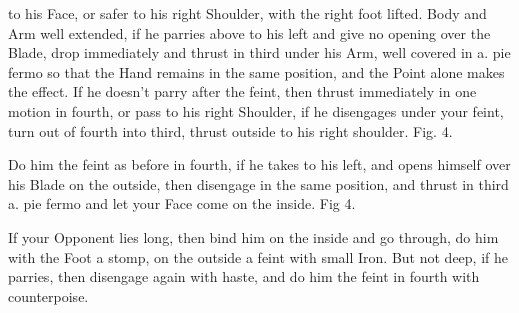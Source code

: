 \newpage


\newpage

\noindent
to his Face, or safer to his right Shoulder, with the right foot
lifted. Body and Arm well extended, if he parries
above to his left and give no opening over the Blade, drop
immediately and thrust in third under his Arm, well covered in a. pie
fermo so that the Hand remains in the same position, and the Point
alone makes the effect. If he doesn't parry after the feint, then
thrust immediately in one motion in fourth, or pass to his right
Shoulder, if he disengages under your feint, turn out of fourth into
third, thrust outside to his right shoulder. Fig. 4.

\exercise{}
Do him the feint as before in fourth, if he takes to his left, and
opens himself over his Blade on the outside, then disengage in the
same position, and thrust in third a. pie fermo and let your Face come
on the inside. Fig 4.

If your Opponent lies long, then bind him on the inside and go
through, do him with the Foot a stomp, on the outside a feint with
small Iron. But not deep, if he parries, then disengage again with
haste, and do him the feint in fourth with counterpoise.

